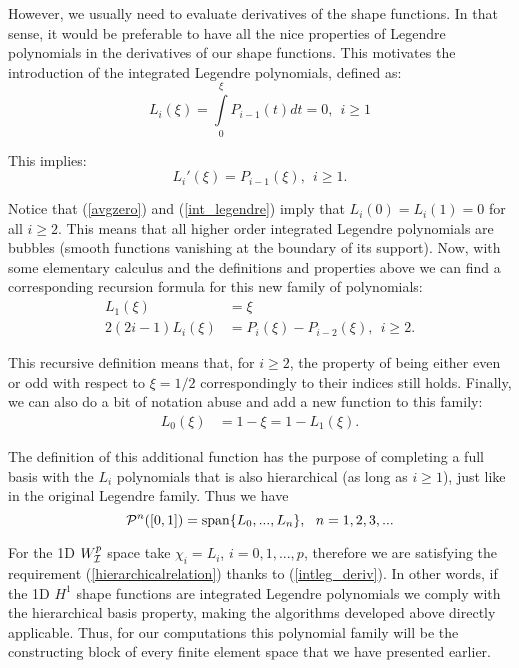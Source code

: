 However, we usually need to evaluate derivatives of the shape functions. In that sense, it would be preferable to have all the nice properties of Legendre polynomials in the derivatives of our shape functions. This motivates the introduction of the integrated Legendre polynomials, defined as:
% 
\begin{equation}
    L_i(\xi)=\int\limits_0^\xi P_{i-1}(t)dt=0,\ \ i\geq 1 \label{int_legendre}
\end{equation}

\noindent This implies:
% 
\begin{equation}
    L_i'(\xi)=P_{i-1}(\xi),\ \ i\geq 1. \label{intleg_deriv}
\end{equation}

Notice that (\ref{avgzero}) and (\ref{int_legendre}) imply that $L_i(0)=L_i(1)=0$ for all $i\geq 2$. This means that all higher order integrated Legendre polynomials are bubbles (smooth functions vanishing at the boundary of its support). Now, with some elementary calculus and the definitions and properties above we can find a corresponding recursion formula for this new family of polynomials:
% 
\begin{align}
    L_1(\xi)&=\xi \\
    2(2i-1)L_i(\xi)&=P_i(\xi)-P_{i-2}(\xi),\ \ i\geq 2.\label{intlegendre_rec}
\end{align}

This recursive definition means that, for $i\geq2$, the property of being either even or odd with respect to $\xi=1/2$ correspondingly to their indices still holds. Finally, we can also do a bit of notation abuse and add a new function to this family:
% 
\begin{align}
    L_0(\xi)&=1-\xi=1-L_1(\xi). \label{affine0}
\end{align}

The definition of this additional function has the purpose of completing a full basis with the $L_i$ polynomials that is also hierarchical (as long as $i\geq 1$), just like in the original Legendre family. Thus we have
% 
\begin{equation}
    \mcP^n([0,1])=\spann\{L_0,...,L_n\},\ \ n=1,2,3,...\label{hier_intleg}
\end{equation}

For the 1D $W^p_{\mathcal{I}}$ space take $\chi_i=L_i$, $i=0,1,...,p$, therefore we are satisfying the requirement (\ref{hierarchicalrelation}) thanks to (\ref{intleg_deriv}). In other words, if the 1D $H^1$ shape functions are integrated Legendre polynomials we comply with the hierarchical basis property, making the algorithms developed above directly applicable. Thus, for our computations this polynomial family will be the constructing block of every finite element space that we have presented earlier.